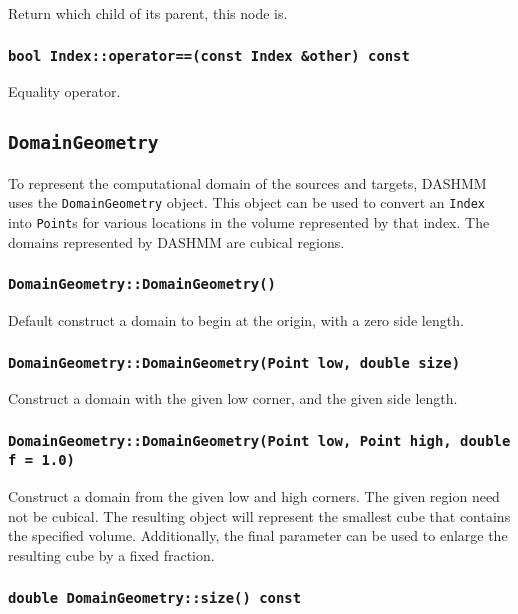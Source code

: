 Return which child of its parent, this node is.

\subsubsection{\texttt{bool Index::operator==(const Index \&other) const}}

Equality operator.


\subsection{\texttt{DomainGeometry}}

To represent the computational domain of the sources and targets, DASHMM
uses the \texttt{DomainGeometry} object. This object can be used to convert
an \texttt{Index} into \texttt{Point}s for various locations in the volume
represented by that index. The domains represented by DASHMM are cubical
regions.

\subsubsection{\texttt{DomainGeometry::DomainGeometry()}}

Default construct a domain to begin at the origin, with a zero side length.

\subsubsection{\texttt{DomainGeometry::DomainGeometry(Point low, double size)}}

Construct a domain with the given low corner, and the given side length.

\subsubsection{\texttt{DomainGeometry::DomainGeometry(Point low, Point high, double f = 1.0)}}

Construct a domain from the given low and high corners. The given region need
not be cubical. The resulting object will represent the smallest cube that
contains the specified volume. Additionally, the final parameter can be used
to enlarge the resulting cube by a fixed fraction.

\subsubsection{\texttt{double DomainGeometry::size() const}}

